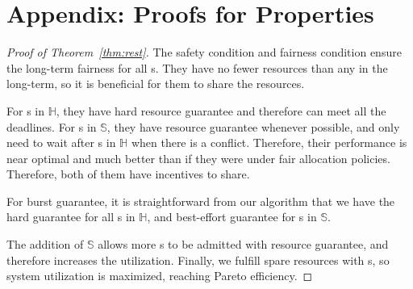 \appendix
\section*{Appendix: Proofs for \name Properties}
\label{sec:app}

\begin{proof}[Proof of Theorem~\ref{thm:rest}]%
The safety condition and fairness condition ensure the long-term fairness for all {\batchq}s. They have no fewer resources than any {\burstq} in the long-term, so it is beneficial for them to share the resources. 

For {\burstq}s in $\mathbb{H}$, they have hard resource guarantee and therefore can meet all the deadlines. For {\burstq}s in $\mathbb{S}$, they have resource guarantee whenever possible, and only need to wait after {\burstq}s in $\mathbb{H}$ when there is a conflict. Therefore, their performance is near optimal and much better than if they were under fair allocation policies. Therefore, both of them have incentives to share. %

For burst guarantee, it is straightforward from our algorithm that we have the hard guarantee for all {\burstq}s in $\mathbb{H}$, and best-effort guarantee for {\burstq}s in $\mathbb{S}$.

The addition of $\mathbb{S}$ allows more {\burstq}s to be admitted with resource guarantee, and therefore increases the {\burstq} utilization. Finally, we fulfill spare resources with {\batchq}s, so system utilization is maximized, reaching Pareto efficiency.
\end{proof}


